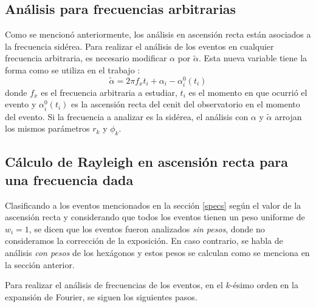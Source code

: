   \subsection{Análisis para frecuencias arbitrarias}
  Como se mencionó anteriormente, los análisis en ascensión recta están asociados a la frecuencia sidérea. Para realizar el análisis de los eventos en cualquier frecuencia arbitraria, es necesario modificar $\alpha$ por $\tilde{\alpha}$. Esta nueva variable tiene la forma como se utiliza en el trabajo \cite{taborda}:
  \begin{equation}
    \tilde{\alpha} = 2\pi f_x t_i + \alpha_i - \alpha_i^0(t_i) \label{ra_mod}
  \end{equation}
  donde $f_x$ es el frecuencia arbitraria a estudiar, $t_i$ es el momento en que ocurrió el evento y $\alpha_i^0(t_i)$ es la ascensión recta del cenit del observatorio en el momento del evento. Si la frecuencia a analizar es la sidérea, el análisis con $\alpha$ y $\tilde{\alpha}$ arrojan los mismos parámetros $r_k$ y $\phi_k$.


 \subsection{Cálculo de Rayleigh en ascensión recta para una frecuencia dada} \label{rayleigh}
 Clasificando a los eventos mencionados en la sección \ref{specs} según el valor de la ascensión recta y considerando que todos los eventos tienen un peso uniforme de $w_i=1$, se dicen que los eventos fueron analizados \textit{sin pesos}, donde no consideramos la corrección de la exposición. En caso contrario, se habla de análisis \textit{con pesos} de los hexágonos  y estos pesos se calculan como se menciona en la sección anterior.

 Para realizar el análisis de frecuencias de los eventos, en el $k$-ésimo orden en la expansión de Fourier, se siguen los siguientes pasos.

